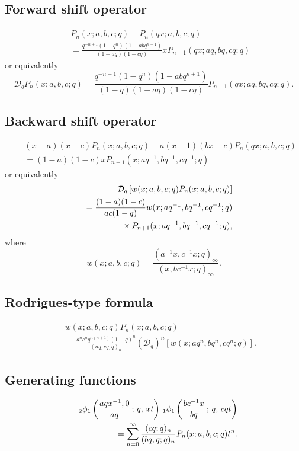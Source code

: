 \documentclass[envcountchap,graybox]{svmono}
\newcommand{\qhyp}[5]{\mbox{}_{#1}{\phi}_{#2}
\left(\genfrac{}{}{0pt}{}{#3}{#4}\,;\,q,\,#5\right)}
\newcommand{\mathindent}{\hspace{7.5mm}}
\newcommand{\qhyp}[5]{\,\mbox{}_{#1}\phi_{#2}\!\left(
  \genfrac{}{}{0pt}{}{#3}{#4};#5\right)}
\begin{document}
\subsection*{Forward shift operator}
\begin{eqnarray}
\label{shift1BigqJacobiI}
& &P_n(x;a,b,c;q)-P_n(qx;a,b,c;q)\nonumber\\
& &{}=\frac{q^{-n+1}(1-q^n)(1-abq^{n+1})}{(1-aq)(1-cq)}xP_{n-1}(qx;aq,bq,cq;q)
\end{eqnarray}
or equivalently
\begin{equation}
\label{shift1BigqJacobiII}
\mathcal{D}_qP_n(x;a,b,c;q)=\frac{q^{-n+1}(1-q^n)(1-abq^{n+1})}
{(1-q)(1-aq)(1-cq)}P_{n-1}(qx;aq,bq,cq;q).
\end{equation}

\subsection*{Backward shift operator}
\begin{eqnarray}
\label{shift2BigqJacobiI}
& &(x-a)(x-c)P_n(x;a,b,c;q)-a(x-1)(bx-c)P_n(qx;a,b,c;q)\nonumber\\
& &{}=(1-a)(1-c)xP_{n+1}(x;aq^{-1},bq^{-1},cq^{-1};q)
\end{eqnarray}
or equivalently
\begin{eqnarray}
\label{shift2BigqJacobiII}
& &\mathcal{D}_q\left[w(x;a,b,c;q)P_n(x;a,b,c;q)\right]\nonumber\\
& &{}=\frac{(1-a)(1-c)}{ac(1-q)}w(x;aq^{-1},bq^{-1},cq^{-1};q)\nonumber\\
& &{}\mathindent{}\times P_{n+1}(x;aq^{-1},bq^{-1},cq^{-1};q),
\end{eqnarray}
where
$$w(x;a,b,c;q)=\frac{(a^{-1}x,c^{-1}x;q)_{\infty}}{(x,bc^{-1}x;q)_{\infty}}.$$

\subsection*{Rodrigues-type formula}
\begin{eqnarray}
\label{RodBigqJacobi}
& &w(x;a,b,c;q)P_n(x;a,b,c;q)\nonumber\\
& &{}=\frac{a^nc^nq^{n(n+1)}(1-q)^n}
{(aq,cq;q)_n}\left(\mathcal{D}_q\right)^n\left[w(x;aq^n,bq^n,cq^n;q)\right].
\end{eqnarray}

\subsection*{Generating functions}
\begin{eqnarray}
\label{GenBigqJacobi1}
& &\qhyp{2}{1}{aqx^{-1},0}{aq}{xt}\,\qhyp{1}{1}{bc^{-1}x}{bq}{cqt}\nonumber\\
& &{}=\sum_{n=0}^{\infty}\frac{(cq;q)_n}{(bq,q;q)_n}P_n(x;a,b,c;q)t^n.
\end{eqnarray}
\end{document}
